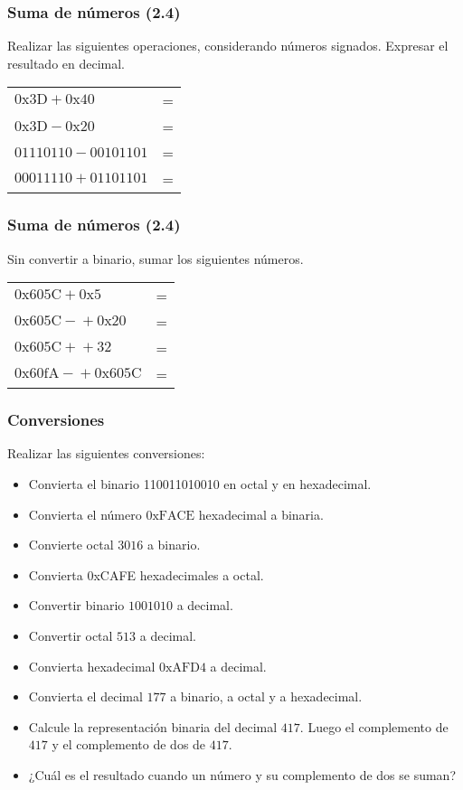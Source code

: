 \subsubsection{Suma de números (2.4)}
Realizar las siguientes operaciones, considerando números signados. Expresar el resultado en decimal.
\vspace{10mm}

\begin{tabular}{lc}
  $\mathrm{0x3D} + \mathrm{0x40} $&=\underspace\\
  $\mathrm{0x3D} - \mathrm{0x20} $&=\underspace\\
  $\mathrm{01110110} - \mathrm{00101101}$&=\underspace\\
  $\mathrm{00011110} + \mathrm{01101101}$&=\underspace\\

\end{tabular}

\subsubsection{Suma de números (2.4)}
Sin convertir a binario, sumar los siguientes números.

\begin{tabular}{lc}
  $\mathrm{0x605C} + \mathrm{0x5} $&=\underspace\\
  $\mathrm{0x605C -} + \mathrm{0x20} $&=\underspace\\
  $\mathrm{0x605C +} + \mathrm{32} $&=\underspace\\
  $\mathrm{0x60fA -} + \mathrm{0x605C} $&=\underspace\\
\end{tabular}

\subsubsection{Conversiones}
Realizar las siguientes conversiones:
\begin{itemize}
  \item Convierta el binario 110011010010 en octal y en hexadecimal.
  \item Convierta el número $\mathrm{0xFACE}$ hexadecimal a binaria.
  \item Convierte octal $\mathrm{3016}$ a binario.
  \item Convierta 0xCAFE hexadecimales a octal.
  \item Convertir binario $\mathrm{1001010}$ a decimal.
  \item Convertir octal $\mathrm{513}$ a decimal.
  \item Convierta hexadecimal $\mathrm{0xAFD4}$ a decimal.
  \item Convierta el decimal $\mathrm{177}$ a binario, a octal y a hexadecimal.
  \item Calcule la representación binaria del decimal $\mathrm{417}$. Luego el complemento de $\mathrm{417}$ y el complemento de dos de $\mathrm{417}$.
  \item ¿Cuál es el resultado cuando un número y su complemento de dos se suman?
\end{itemize}

